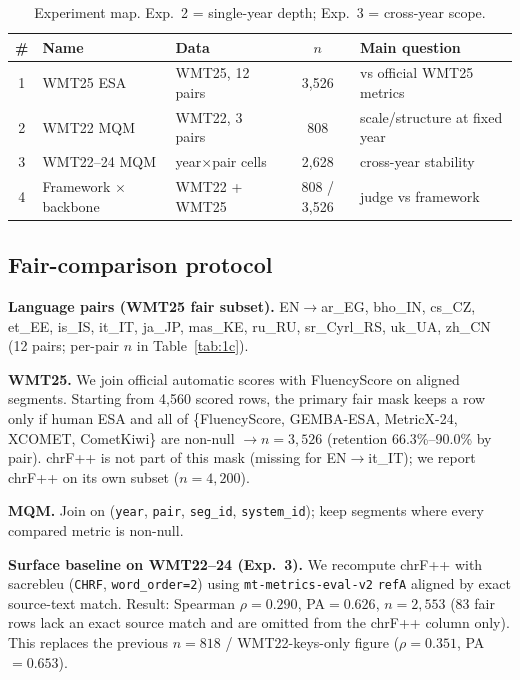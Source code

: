 \documentclass[11pt]{article}
\newcommand{\FS}{FluencyScore}
\begin{document}
\begin{table}[t]
\centering
\scriptsize
\caption{Experiment map. Exp.~2 = single-year depth; Exp.~3 = cross-year scope.}
\label{tab:expmap}
\begin{tabularx}{\columnwidth}{@{}c>{\raggedright\arraybackslash}X>{\raggedright\arraybackslash}Xc>{\raggedright\arraybackslash}X@{}}
\toprule
\# & Name & Data & $n$ & Main question \\
\midrule
1 & WMT25 ESA & WMT25, 12 pairs & 3,526 & vs official WMT25 metrics \\
2 & WMT22 MQM & WMT22, 3 pairs & 808 & scale/structure at fixed year \\
3 & WMT22--24 MQM & 9 year$\times$pair cells & 2,628 & cross-year stability \\
4 & Framework $\times$ backbone & WMT22 + WMT25 & 808 / 3,526 & judge vs framework \\
\bottomrule
\end{tabularx}

\end{table}


\subsection{Fair-comparison protocol}
\label{sec:fair}
\textbf{Language pairs (WMT25 fair subset).}
EN$\to$ar\_EG, bho\_IN, cs\_CZ, et\_EE, is\_IS, it\_IT, ja\_JP, mas\_KE,
ru\_RU, sr\_Cyrl\_RS, uk\_UA, zh\_CN (12 pairs; per-pair $n$ in Table~\ref{tab:1c}).

\textbf{WMT25.}
We join official automatic scores with \FS{} on aligned segments.
Starting from 4,560 scored rows, the primary fair mask keeps a row only if human
ESA and all of \{\FS{}, GEMBA-ESA, MetricX-24, XCOMET, CometKiwi\} are non-null
$\rightarrow n{=}3{,}526$ (retention 66.3\%--90.0\% by pair).
chrF++ is not part of this mask (missing for EN$\to$it\_IT); we report chrF++ on
its own subset ($n{=}4{,}200$).

\textbf{MQM.}
Join on (\texttt{year}, \texttt{pair}, \texttt{seg\_id}, \texttt{system\_id});
keep segments where every compared metric is non-null.

\textbf{Surface baseline on WMT22--24 (Exp.~3).}
We recompute chrF++ with sacrebleu (\texttt{CHRF}, \texttt{word\_order=2}) using
\texttt{mt-metrics-eval-v2} \texttt{refA} aligned by exact source-text match.
Result: Spearman $\rho{=}0.290$, PA${=}0.626$, $n{=}2{,}553$
(83 fair rows lack an exact source match and are omitted from the chrF++ column
only). This replaces the previous $n{=}818$ / WMT22-keys-only figure
($\rho{=}0.351$, PA${=}0.653$).
\end{document}
